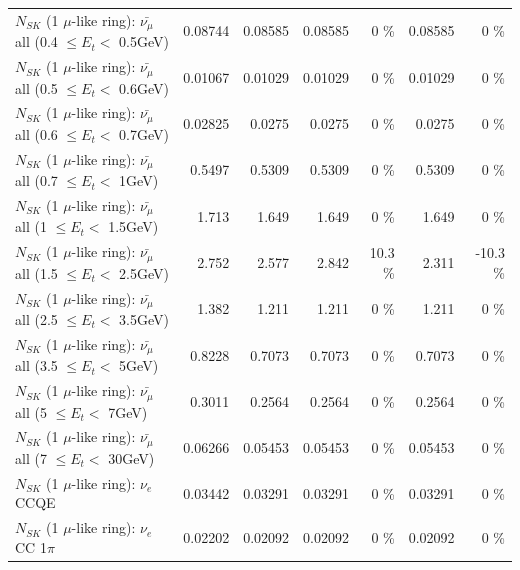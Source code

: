 \begin{table}
\begin{tabular}{| l | r | r | r  r | r  r |}
 $N_{SK}$ (1 $\mu$-like ring): $\bar{\nu_{\mu}}$ all (0.4 $\leq E_{t} <$ 0.5GeV) &         0.08744 &         0.08585 &         0.08585 &        0 \%  &         0.08585 &        0 \%  \\ 
 $N_{SK}$ (1 $\mu$-like ring): $\bar{\nu_{\mu}}$ all (0.5 $\leq E_{t} <$ 0.6GeV) &         0.01067 &         0.01029 &         0.01029 &        0 \%  &         0.01029 &        0 \%  \\ 
 $N_{SK}$ (1 $\mu$-like ring): $\bar{\nu_{\mu}}$ all (0.6 $\leq E_{t} <$ 0.7GeV) &         0.02825 &          0.0275 &          0.0275 &        0 \%  &          0.0275 &        0 \%  \\ 
   $N_{SK}$ (1 $\mu$-like ring): $\bar{\nu_{\mu}}$ all (0.7 $\leq E_{t} <$ 1GeV) &          0.5497 &          0.5309 &          0.5309 &        0 \%  &          0.5309 &        0 \%  \\ 
   $N_{SK}$ (1 $\mu$-like ring): $\bar{\nu_{\mu}}$ all (1 $\leq E_{t} <$ 1.5GeV) &           1.713 &           1.649 &           1.649 &        0 \%  &           1.649 &        0 \%  \\ 
 $N_{SK}$ (1 $\mu$-like ring): $\bar{\nu_{\mu}}$ all (1.5 $\leq E_{t} <$ 2.5GeV) &           2.752 &           2.577 &           2.842 &     10.3 \%  &           2.311 &    -10.3 \%  \\ 
 $N_{SK}$ (1 $\mu$-like ring): $\bar{\nu_{\mu}}$ all (2.5 $\leq E_{t} <$ 3.5GeV) &           1.382 &           1.211 &           1.211 &        0 \%  &           1.211 &        0 \%  \\ 
   $N_{SK}$ (1 $\mu$-like ring): $\bar{\nu_{\mu}}$ all (3.5 $\leq E_{t} <$ 5GeV) &          0.8228 &          0.7073 &          0.7073 &        0 \%  &          0.7073 &        0 \%  \\ 
     $N_{SK}$ (1 $\mu$-like ring): $\bar{\nu_{\mu}}$ all (5 $\leq E_{t} <$ 7GeV) &          0.3011 &          0.2564 &          0.2564 &        0 \%  &          0.2564 &        0 \%  \\ 
    $N_{SK}$ (1 $\mu$-like ring): $\bar{\nu_{\mu}}$ all (7 $\leq E_{t} <$ 30GeV) &         0.06266 &         0.05453 &         0.05453 &        0 \%  &         0.05453 &        0 \%  \\ 
\hline
\hline
\hline
                                      $N_{SK}$ (1 $\mu$-like ring): $\nu_e$ CCQE &         0.03442 &         0.03291 &         0.03291 &        0 \%  &         0.03291 &        0 \%  \\ 
                                 $N_{SK}$ (1 $\mu$-like ring): $\nu_e$ CC 1$\pi$ &         0.02202 &         0.02092 &         0.02092 &        0 \%  &         0.02092 &        0 \%  \\ 

\end{tabular}
\end{table}
